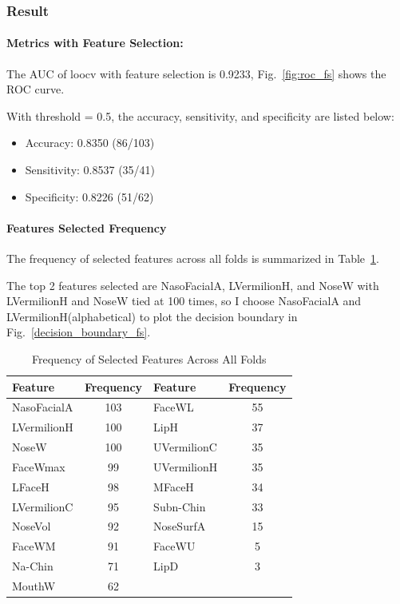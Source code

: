 \documentclass[12pt,a4paper]{article}
\begin{document}
\subsubsection{Result}
\paragraph{Metrics with Feature Selection: }

The AUC of loocv with feature selection is 0.9233, Fig.~\ref{fig:roc_fs} shows the ROC curve.

With threshold = 0.5, the accuracy, sensitivity, and specificity are listed below:    
\begin{itemize}
    \item Accuracy:    0.8350 (86/103)
    \item Sensitivity: 0.8537 (35/41)
    \item Specificity: 0.8226 (51/62)
\end{itemize}

\paragraph{Features Selected Frequency}
The frequency of selected features across all folds is summarized in Table~\ref{tab:feature_frequency}.

The top 2 features selected are NasoFacialA, LVermilionH, and NoseW with LVermilionH and NoseW tied at 100 times, so I choose NasoFacialA and LVermilionH(alphabetical) to plot the decision boundary in Fig.~\ref{decision_boundary_fs}.


\begin{table}[H]
    \centering
    \caption{Frequency of Selected Features Across All Folds}
    \label{tab:feature_frequency}
    \begin{tabular}{lclc}
        \toprule
        \textbf{Feature} & \textbf{Frequency} & \textbf{Feature} & \textbf{Frequency} \\
        \midrule
        NasoFacialA    & 103 & FaceWL         & 55  \\
        LVermilionH    & 100 & LipH           & 37  \\
        NoseW          & 100 & UVermilionC    & 35  \\
        FaceWmax       & 99  & UVermilionH    & 35  \\
        LFaceH         & 98  & MFaceH         & 34  \\
        LVermilionC    & 95  & Subn-Chin      & 33  \\
        NoseVol        & 92  & NoseSurfA      & 15  \\
        FaceWM         & 91  & FaceWU         & 5   \\
        Na-Chin        & 71  & LipD           & 3   \\
        MouthW         & 62  &                &     \\
        \bottomrule
    \end{tabular}
\end{table}
\end{document}
